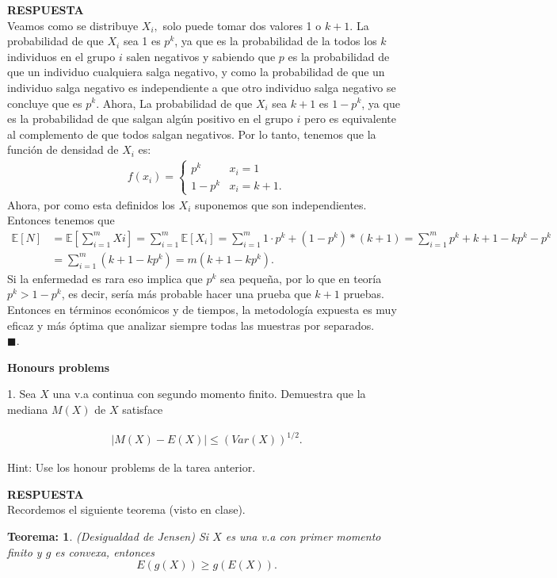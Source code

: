 \documentclass[11pt,letterpaper]{article}
\newcommand{\mE}{\mathbb{E}}
\newcommand{\res}{\textbf{RESPUESTA}\\}
\newcommand{\fin}{$\blacksquare.$}
\newtheorem{thmt}{Teorema:}
\begin{document}
\res Veamos como se distribuye $X_i,$ solo puede tomar dos valores 1 o $k+1$. La probabilidad de que $X_i$ sea 1 es $p^k$, ya que es la probabilidad de la todos los $k$ individuos en el grupo $i$ salen negativos y sabiendo que $p$ es la probabilidad de que un individuo cualquiera salga negativo, y como la probabilidad de que un individuo salga negativo es independiente a que otro individuo salga negativo se concluye que es $p^k$. Ahora, La probabilidad de que $X_i$ sea $k+1$ es $1-p^k$, ya que es la probabilidad de que salgan algún positivo en el grupo $i$ pero es equivalente al complemento de que todos salgan negativos. Por lo tanto, tenemos que la función de densidad de $X_i$ es:
\begin{align*}
f(x_i)=\left\{\begin{array}{cc}
p^k & x_i=1\\
1-p^k & x_i=k+1. 
\end{array} \right.
\end{align*}
Ahora, por como esta definidos los $X_i$ suponemos que son independientes. Entonces tenemos que
\begin{align*}
\mE[N]&=\mE\left[\sum_{i=1}^m Xi\right]= \sum_{i=1}^m \mE[X_i]=\sum_{i=1}^m 1\cdot p^k+(1-p^k)*(k+1)=\sum_{i=1}^m p^k+k+1-kp^k-p^k\\
&=\sum_{i=1}^m (k+1-kp^k)=m(k+1-kp^k).
\end{align*}
Si la enfermedad es rara eso implica que $p^k$ sea pequeña, por lo que en teoría $p^k>1-p^k$, es decir, sería más probable hacer una prueba que $k+1$ pruebas. Entonces en términos económicos y de tiempos, la metodología expuesta es muy eficaz y más óptima que analizar siempre todas las muestras por separados.  \ \ \ \fin

\textbf{Honours problems}

1. Sea $X$ una v.a continua con segundo momento finito. Demuestra que la mediana $M(X)$ de $X$ satisface

\begin{align*}
|M(X)-E(X)|\leq (Var(X))^{1/2}.
\end{align*}

Hint: Use los honour problems de la tarea anterior.

\res Recordemos el siguiente teorema (visto en clase). 
\begin{framed}
    \begin{thmt}(Desigualdad de Jensen) \label{desigualdad_de_Jensen}
    Si $X$ es una v.a con primer momento finito y $g$ es convexa, entonces 
    $$E(g(X))\geq g(E(X)).$$
    \end{thmt}
\end{framed} 
\end{document}
